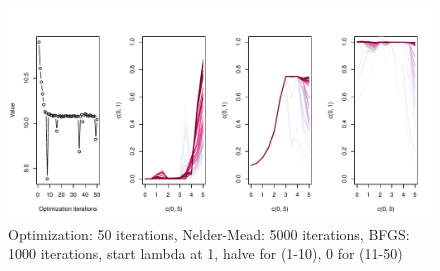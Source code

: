 \documentclass[12pt, oneside, titlepage]{article}   	%
\begin{document}
 \begin{figure}[h]
   \centering
       \includegraphics[width=1\textwidth]{../unbranched-determinate-convergence2500-1000-50iter-2.pdf}  
    \caption{ Optimization: 50 iterations, Nelder-Mead: 5000 iterations, BFGS: 1000 iterations, start lambda at 1, halve for (1-10), 0 for (11-50) }
 \label{fig:test}
\end{figure}
\end{document}
